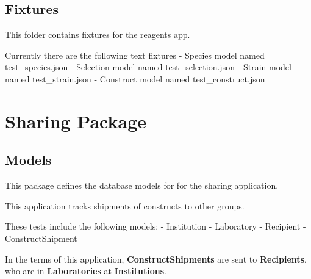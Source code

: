 \documentclass[letterpaper,10pt,english]{sphinxmanual}
\begin{document}
\subsection{Fixtures}
\label{api:id27}\label{api:module-experimentdb.reagents.fixtures}
This folder contains fixtures for the reagents app.


Currently there are the following text fixtures
- Species model named test\_species.json
- Selection model named test\_selection.json
- Strain model named test\_strain.json
- Construct model named test\_construct.json



\section{Sharing Package}
\label{api:sharing-package}\label{api:module-experimentdb.sharing}

\subsection{Models}
\label{api:id28}\label{api:module-experimentdb.sharing.models}
This package defines the database models for for the sharing application.


This application tracks shipments of constructs to other groups.


These tests include the following models:
- Institution
- Laboratory
- Recipient
- ConstructShipment


In the terms of this application, \textbf{ConstructShipments} are sent to \textbf{Recipients}, who are in \textbf{Laboratories} at \textbf{Institutions}.

\end{document}
